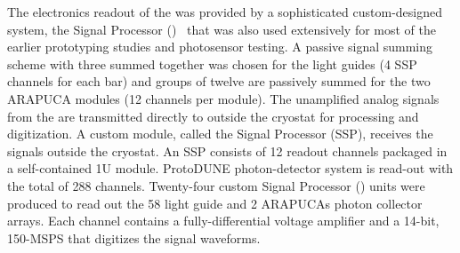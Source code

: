 The electronics readout of the   was provided by a sophisticated custom-designed system, the  Signal Processor ()~ that was also used extensively for most of the earlier prototyping studies and photosensor testing.
A passive signal summing scheme with three  summed together was chosen for the light guides (4 SSP channels for each bar) and groups of twelve  are passively summed for the two ARAPUCA modules (12  channels per module).
The unamplified analog signals from the  are transmitted directly to outside the cryostat for processing and digitization. A custom module, 
called the  Signal Processor (SSP), receives the  signals outside the cryostat. An SSP consists of 12 readout channels packaged in 
a self-contained 1U module. ProtoDUNE photon-detector system is read-out with the total of 288  channels. 
Twenty-four custom  Signal Processor () units were produced to read out the 58 light guide and 2 ARAPUCAs photon collector arrays.
Each channel contains a fully-differential voltage amplifier and a \num{14}-bit, \num{150}-MSPS  that digitizes the  signal waveforms.


